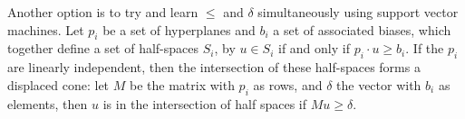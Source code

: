 \documentclass{article}
\begin{document}
Another option is to try and learn $\le$ and $\delta$ simultaneously
using support vector machines. Let $p_i$ be a set of hyperplanes and
$b_i$ a set of associated biases, which together define a set of
half-spaces $S_i$, by $u\in S_i$ if and only if $p_i\cdot u \ge
b_i$. If the $p_i$ are linearly independent, then the intersection of
these half-spaces forms a displaced cone: let $M$ be the matrix with
$p_i$ as rows, and $\delta$ the vector with $b_i$ as elements, then
$u$ is in the intersection of half spaces if $Mu \ge \delta$.
\end{document}
